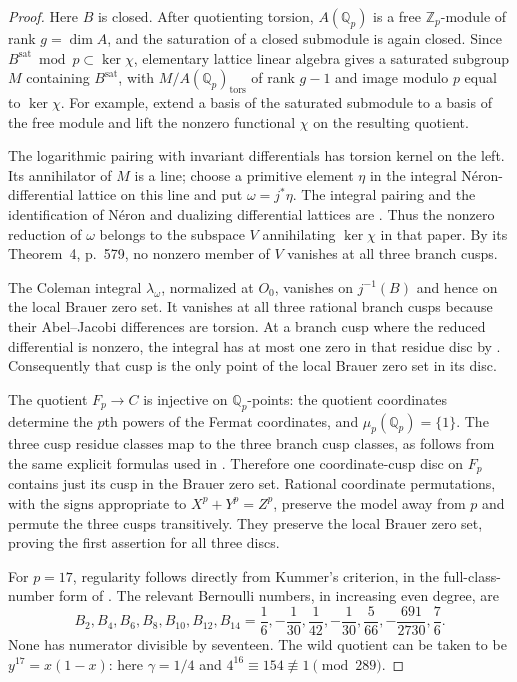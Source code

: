 \begin{proof}
Here $B$ is closed.  After quotienting torsion, $A(\mathbb Q_p)$
is a free $\mathbb Z_p$-module of rank $g=\dim A$, and the
saturation of a closed submodule is again closed.  Since
$B^{\mathrm{sat}}\bmod p\subset\ker\chi$, elementary lattice
linear algebra gives a saturated subgroup $M$ containing
$B^{\mathrm{sat}}$, with $M/A(\mathbb Q_p)_{\mathrm{tors}}$
of rank $g-1$ and image modulo $p$ equal to $\ker\chi$.
For example, extend a basis of the saturated submodule to a
basis of the free module and lift the nonzero functional
$\chi$ on the resulting quotient.

The logarithmic pairing with invariant differentials has torsion
kernel on the left.  Its annihilator of $M$ is a line; choose
a primitive element $\eta$ in the integral N\'eron-differential
lattice on this line and put $\omega=j^*\eta$.
The integral pairing and the identification of N\'eron and
dualizing differential lattices are
\citet[Propositions~2, 3 and~7, pp.~569--570, 578]{McCallum1994}.
Thus the nonzero reduction of $\omega$ belongs to the subspace
$V$ annihilating $\ker\chi$ in that paper.  By its
Theorem~4, p.~579, no nonzero member of $V$ vanishes at all
three branch cusps.

The Coleman integral $\lambda_\omega$, normalized at $O_0$,
vanishes on $j^{-1}(B)$ and hence on the local Brauer zero set.
It vanishes at all three rational branch cusps because their
Abel--Jacobi differences are torsion.  At a branch cusp where
the reduced differential is nonzero, the integral has at most
one zero in that residue disc by
\citet[Lemma~7, pp.~579--580]{McCallum1994}.
Consequently that cusp is the only point of the local Brauer
zero set in its disc.

The quotient $F_p\to C$ is injective on $\mathbb Q_p$-points:
the quotient coordinates determine the $p$th powers of the
Fermat coordinates, and $\mu_p(\mathbb Q_p)=\{1\}$.
The three cusp residue classes map to the three branch cusp
classes, as follows from the same explicit formulas used in
\citet[Lemma~8, p.~580]{McCallum1994}.
Therefore one coordinate-cusp disc on $F_p$ contains just its
cusp in the Brauer zero set.  Rational coordinate permutations,
with the signs appropriate to $X^p+Y^p=Z^p$, preserve the
model away from $p$ and permute the three cusps transitively.
They preserve the local Brauer zero set, proving the first
assertion for all three discs.

For $p=17$, regularity follows directly from Kummer's criterion,
in the full-class-number form of
\citet[Theorem~5.34, p.~78]{Washington1982}.  The relevant
Bernoulli numbers, in increasing even degree, are
\[
 B_2,B_4,B_6,B_8,B_{10},B_{12},B_{14}
 =\frac16,-\frac1{30},\frac1{42},-\frac1{30},
   \frac5{66},-\frac{691}{2730},\frac76.
\]
None has numerator divisible by seventeen.  The wild quotient can be taken to be
$y^{17}=x(1-x)$: here $\gamma=1/4$ and
$4^{16}\equiv154\not\equiv1\pmod {289}$.


\end{proof}
